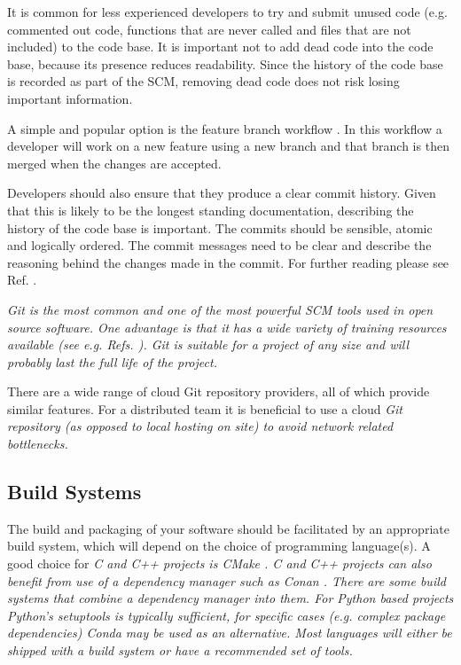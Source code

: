 \documentclass[jnr]{iosart2x}
\begin{document}
It is common for less experienced developers to try and submit unused code (e.g. commented out code, functions that are never called and files that are not included) to the code base.
It is important not to add dead code into the code base, because its presence reduces readability.
Since the history of the code base is recorded as part of the SCM, removing dead code does not risk losing important information.

A simple and popular option is the feature branch workflow \cite{feature-branch}.
In this workflow a developer will work on a new feature using a new branch and that branch is then merged when the changes are accepted.

Developers should also ensure that they produce a clear commit history.
Given that this is likely to be the longest standing documentation, describing the history of the code base is important.
The commits should be sensible, atomic and logically ordered.
The commit messages need to be clear and describe the reasoning behind the changes made in the commit.
For further reading please see Ref. \cite{git-commit}.

\it Git \cite{Git} is the most common and one of the most powerful SCM tools used in open source software.
One advantage is that it has a wide variety of training resources available (see e.g. Refs. \cite{github-git, atlassian-git, codecademy-git}).
\it Git is suitable for a project of any size and will probably last the full life of the project.

There are a wide range of cloud Git repository providers, all of which provide similar features.
For a distributed team it is beneficial to use a cloud \it Git repository (as opposed to local hosting on site) to avoid network related bottlenecks.

\subsection{Build Systems}
\label{Build systems}

The build and packaging of your software should be facilitated by an appropriate build system, which will depend on the choice of programming language(s).
A good choice for \it C and \it C++ projects is \it CMake \cite{CMake}.
\it C and \it C++ projects can also benefit from use of a dependency manager such as \it Conan \cite{Conan}.
There are some build systems that combine a dependency manager into them.
For \it Python based projects \it Python's {\it setuptools} is typically sufficient, for specific cases (e.g. complex package dependencies) \it Conda may be used as an alternative.
Most languages will either be shipped with a build system or have a recommended set of tools.
\end{document}
